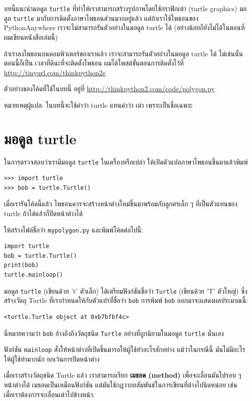 บทนี้แนะนำมอดูล {\tt turtle} ที่ทำให้เราสามารถสร้างรูปภาพโดยใช้กราฟิกเต่า (turtle graphics)
มอดูล {\tt turtle} มากับการติดตั้งภาษาไพธอนส่วนมากอยู่แล้ว แต่ถ้าเราใช้ไพธอนของ PythonAnywhere
เราจะไม่สามารถรันตัวอย่างในมอดูล turtle ได้ (อย่างน้อยก็ยังไม่ได้ในตอนที่ผมเขียนหนังสือเล่มนี้)

ถ้าเราลงไพธอนบนคอมพิวเตอร์ของเราแล้ว เราจะสามารถรันตัวอย่างในมอดูล turtle ได้ ไม่เช่นนั้น ตอนนี้ก็เป็น
เวลาที่ดีนะที่จะติดตั้งไพธอน  ผมได้โพสต์ขั้นตอนการติดตั้งไว้ที่ \url{http://tinyurl.com/thinkpython2e}

ตัวอย่างของโค้ดที่ใช้ในบทนี้ อยู่ที่ \url{http://thinkpython2.com/code/polygon.py}

หมายเหตุผู้แปล: ในบทนี้จะใช้คำว่า turtle แทนคำว่า เต่า เพราะเป็นชื่อเฉพาะ

\section{มอดูล turtle} %
\label{turtle}

ในการตรวจสอบว่าเรามีมอดูล {\tt turtle} ในเครื่องหรือเปล่า ให้เปิดตัวแปลภาษาไพธอนขึ้นมาแล้วพิมพ์

\begin{verbatim}
>>> import turtle
>>> bob = turtle.Turtle()
\end{verbatim}

เมื่อเรารันโค้ดนี้แล้ว ไพธอนควรจะสร้างหน้าต่างใหม่ขึ้นมาพร้อมกับลูกศรเล็ก ๆ ที่เป็นตัวแทนของ turtle
ถ้าได้แล้วก็ปิดหน้าต่างได้

ให้สร้างไฟล์ชื่อว่า {\tt mypolygon.py} และพิมพ์โค้ดต่อไปนี้:

\begin{verbatim}
import turtle
bob = turtle.Turtle()
print(bob)
turtle.mainloop()
\end{verbatim}
%
มอดูล {\tt turtle} (เขียนด้วย 't' ตัวเล็ก) ได้เตรียมฟังก์ชันชื่อว่า {\tt Turtle} (เขียนด้วย 'T' ตัวใหญ่) 
ซึ่งสร้างวัตถุ Turtle ที่เรากำหนดให้กับตัวแปรที่ชื่อว่า {\tt bob} การพิมพ์ {\tt bob} ออกมาจะแสดงผลประมาณนี้:

\begin{verbatim}
<turtle.Turtle object at 0xb7bfbf4c>
\end{verbatim}
%
นี่หมายความว่า {\tt bob} อ้างอิงถึงวัตถุชนิด {\tt Turtle} อย่างที่ถูกนิยามในมอดูล {\tt turtle} นั่นเอง

ฟังก์ชัน \verb"mainloop" สั่งให้หน้าต่างที่เปิดขึ้นมารอให้ผู้ใช้ทำอะไรสักอย่าง แม้ว่าในกรณีนี้ มันไม่มีอะไร
ให้ผู้ใช้ทำมากนัก ยกเว้นการปิดหน้าต่าง

เมื่อเราสร้างวัตถุชนิด Turtle แล้ว เราสามารถเรียก {\bf เมธอด (method)} เพื่อจะเลื่อนมันไปรอบ ๆ หน้าต่างได้
เมธอดเป็นเหมือนฟังก์ชัน แต่มันใช้กฎวากยสัมพันธ์ในการเขียนที่ต่างไปนิดหน่อย เช่น 
เมื่อเราต้องการจะเลื่อนเต่าไปข้างหน้า:


